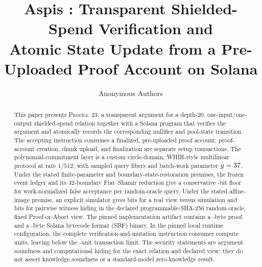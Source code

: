\documentclass[11pt]{article}
\title{Aspis \Profile: Transparent Shielded-Spend Verification and\\
Atomic State Update from a Pre-Uploaded Proof Account on Solana}
\author{Anonymous Authors}
\date{}
\theoremstyle{definition}
\theoremstyle{remark}
\newcommand{\Profile}{\textsc{Profile~23}}
\begin{document}
\maketitle

\begin{abstract}
This paper presents \Profile, a transparent argument for a depth-20,
one-input/one-output shielded-spend relation together with a Solana program
that verifies the argument and atomically records the corresponding nullifier
and pool-state transition.  The accepting instruction consumes a finalized,
pre-uploaded proof account; proof-account creation, chunk upload, and
finalization are separate setup transactions.  The polynomial-commitment
layer is a custom circle-domain, WHIR-style multilinear protocol at rate
$1/512$, with \ProfileQueryCount{} sampled query fibers and batch-work
parameter $g=37$.  Under the stated finite-parameter and
boundary-state-restoration premises, the frozen event ledger and its
32-boundary Fiat--Shamir reduction give a conservative
\ProfileSoundnessBits-bit floor for work-normalized false acceptance per
random-oracle query.  Under the stated affine-image premise, an explicit simulator gives
\ProfileSimulationBits{} bits for a real view versus simulation and
\ProfilePairwiseBits{} bits for pairwise witness hiding in the declared
programmable-SHA-256 random-oracle, fixed Proof-or-Abort view.  The pinned
implementation artifact contains a \ProfileProofBytes-byte proof and a
\ProfileSbfBytes-byte Solana bytecode format (SBF) binary.  In the pinned
local runtime configuration,
the complete verification-and-mutation instruction consumes
\ProfileComputeUnits{} compute units, leaving \ProfileComputeHeadroom{} below
the \ProfileComputeLimit-unit transaction limit.  The security statements are
argument soundness and computational hiding for the exact relation and
declared view; they do not assert knowledge soundness or a standard-model
zero-knowledge result.
\end{abstract}
















\appendix




\end{document}

